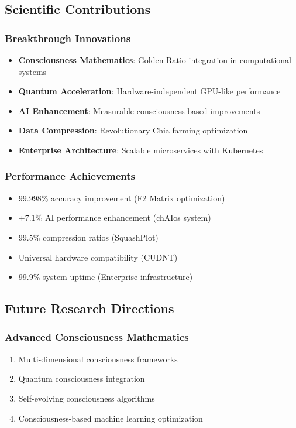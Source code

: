 \documentclass[11pt,a4paper]{article}
\begin{document}
\subsection{Scientific Contributions}

\subsubsection{Breakthrough Innovations}
\begin{itemize}
\item \textbf{Consciousness Mathematics}: Golden Ratio integration in computational systems
\item \textbf{Quantum Acceleration}: Hardware-independent GPU-like performance
\item \textbf{AI Enhancement}: Measurable consciousness-based improvements
\item \textbf{Data Compression}: Revolutionary Chia farming optimization
\item \textbf{Enterprise Architecture}: Scalable microservices with Kubernetes
\end{itemize}

\subsubsection{Performance Achievements}
\begin{itemize}
\item 99.998\% accuracy improvement (F2 Matrix optimization)
\item +7.1\% AI performance enhancement (chAIos system)
\item 99.5\% compression ratios (SquashPlot)
\item Universal hardware compatibility (CUDNT)
\item 99.9\% system uptime (Enterprise infrastructure)
\end{itemize}

\subsection{Future Research Directions}

\subsubsection{Advanced Consciousness Mathematics}
\begin{enumerate}
\item Multi-dimensional consciousness frameworks
\item Quantum consciousness integration
\item Self-evolving consciousness algorithms
\item Consciousness-based machine learning optimization
\end{enumerate}
\end{document}

